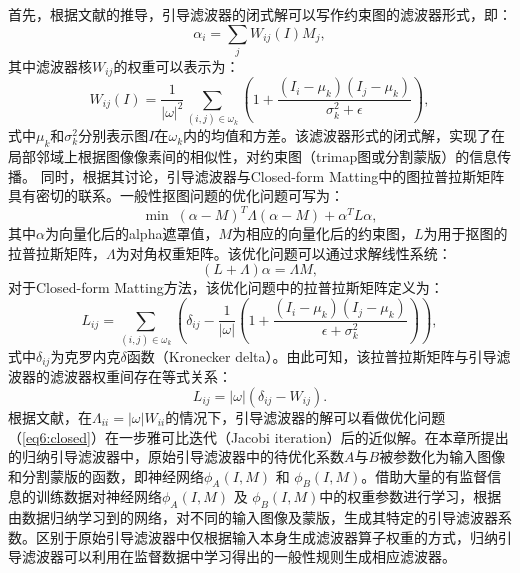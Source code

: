 首先，根据文献\parencite{he2010guided}的推导，引导滤波器的闭式解可以写作约束图的滤波器形式，即：
\begin{equation}
	\alpha_i = \sum_j W_{ij}(I)M_j,
\end{equation}
其中滤波器核$W_{ij}$的权重可以表示为：
\begin{equation}
	W_{ij}(I) = \frac{1}{|\omega|^2} \sum_{(i,j)\in \omega_k}(1+\frac{(I_i-\mu_k)(I_j-\mu_k)}{\sigma^2_k+\epsilon}),
\end{equation}
式中$\mu_k$和$\sigma^2_k$分别表示图$I$在$\omega_k$内的均值和方差。该滤波器形式的闭式解，实现了在局部邻域上根据图像像素间的相似性，对约束图（trimap图或分割蒙版）的信息传播。
同时，根据其讨论，引导滤波器与Closed-form Matting\cite{levin2008closed}中的图拉普拉斯矩阵具有密切的联系。一般性抠图问题的优化问题可写为：
\begin{equation}
	\mathop{\mathrm{min}}\; (\alpha-M)^T\Lambda(\alpha-M)+\alpha^T L\alpha,
	\label{eq6:closed}
\end{equation}
其中$\alpha$为向量化后的alpha遮罩值，$M$为相应的向量化后的约束图，$L$为用于抠图的拉普拉斯矩阵，$\Lambda$为对角权重矩阵。该优化问题可以通过求解线性系统：
\begin{equation}
	(L+\Lambda)\alpha=\Lambda M,
\end{equation}
对于Closed-form Matting方法，该优化问题中的拉普拉斯矩阵定义为：
\begin{equation}
	L_{ij} = \sum_{(i,j)\in \omega_k}(\delta_{ij}-\frac{1}{|\omega|} (1+\frac{(I_i-\mu_k)(I_j-\mu_k)}{\epsilon+\sigma^2_k})),
\end{equation}
式中$\delta_{ij}$为克罗内克$\delta$函数（Kronecker delta）。由此可知，该拉普拉斯矩阵与引导滤波器的滤波器权重间存在等式关系：
\begin{equation}
	L_{ij}=|\omega|(\delta_{ij}-W_{ij}).
\end{equation}
根据文献\parencite{he2010guided}，在$\Lambda_{ii}=|\omega|W_{ii}$的情况下，引导滤波器的解可以看做优化问题（\ref{eq6:closed}）在一步雅可比迭代（Jacobi iteration）后的近似解。在本章所提出的归纳引导滤波器中，原始引导滤波器中的待优化系数$A$与$B$被参数化为输入图像和分割蒙版的函数，即神经网络$ \phi_{A}(I, M) $ 和 $ \phi_{B}(I, M) $。借助大量的有监督信息的训练数据对神经网络$ \phi_{A}(I, M) $ 及 $ \phi_{B}(I, M) $中的权重参数进行学习，根据由数据归纳学习到的网络，对不同的输入图像及蒙版，生成其特定的引导滤波器系数。区别于原始引导滤波器中仅根据输入本身生成滤波器算子权重的方式，归纳引导滤波器可以利用在监督数据中学习得出的一般性规则生成相应滤波器。

